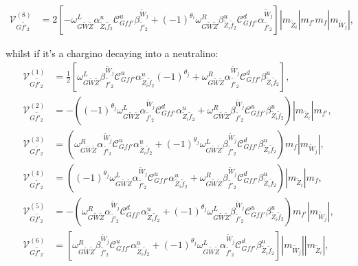 \documentclass[final,3p,times]{elsarticle}
\begin{document}
\begin{align}
\mathcal{V}_{G \tilde{f'}_2}^{(8)} &= 2[-\omega_{G \tilde{W} \tilde{Z}}^L \alpha_{\tilde{Z}_i \tilde{f}_2}^{u} \mathcal{C}_{G f f'}^u \beta_{\tilde{f'}_2}^{\tilde{W}_j} + (-1)^{\theta_i} \omega_{G \tilde{W} \tilde{Z}}^R \beta_{\tilde{Z}_i \tilde{f}_2}^{u} \mathcal{C}_{G f f'}^d \alpha_{\tilde{f'}_2}^{\tilde{W}_j}]|m_{\tilde{Z}_i}|m_{f'}m_{f}|m_{\tilde{W}_j}|,
\end{align}

whilst if it's a chargino decaying into a neutralino:
\begin{align}
\mathcal{V}_{G \tilde{f'}_2}^{(1)} &= \frac{1}{2}[\omega_{G \tilde{W} \tilde{Z}}^L \beta_{\tilde{f'}_2}^{\tilde{W}_j} \mathcal{C}_{G f f'}^u \alpha_{\tilde{Z}_i \tilde{f}_2}^{u} (-1)^{\theta_j} + \omega_{G \tilde{W} \tilde{Z}}^R \alpha_{\tilde{f'}_2}^{\tilde{W}_j} \mathcal{C}_{G f f'}^d \beta_{\tilde{Z}_i \tilde{f}_2}^{u} ], \\
\mathcal{V}_{G \tilde{f'}_2}^{(2)} &= -((-1)^{\theta_j}\omega_{G \tilde{W} \tilde{Z}}^L \alpha_{\tilde{f'}_2}^{\tilde{W}_j} \mathcal{C}_{G f f'}^d \alpha_{\tilde{Z}_i \tilde{f}_2}^{u} +  \omega_{G \tilde{W} \tilde{Z}}^R \beta_{\tilde{f'}_2}^{\tilde{W}_j} \mathcal{C}_{G f f'}^u \beta_{\tilde{Z}_i \tilde{f}_2}^{u})|m_{\tilde{Z}_i}|m_{f'}, \\
\mathcal{V}_{G \tilde{f'}_2}^{(3)} &= (\omega_{G \tilde{W} \tilde{Z}}^R \alpha_{\tilde{f'}_2}^{\tilde{W}_j} \mathcal{C}_{G f f'}^u \alpha_{\tilde{Z}_i \tilde{f}_2}^{u} + (-1)^{\theta_j}\omega_{G \tilde{W} \tilde{Z}}^L \beta_{\tilde{f'}_2}^{\tilde{W}_j} \mathcal{C}_{G f f'}^d \beta_{\tilde{Z}_i \tilde{f}_2}^{u})m_{f}|m_{\tilde{W}_j}| ,\\
\mathcal{V}_{G \tilde{f'}_2}^{(4)} &= ((-1)^{\theta_j}\omega_{G \tilde{W} \tilde{Z}}^L \alpha_{\tilde{f'}_2}^{\tilde{W}_j} \mathcal{C}_{G f f'}^u \alpha_{\tilde{Z}_i \tilde{f}_2}^{u} + \omega_{G \tilde{W} \tilde{Z}}^R \beta_{\tilde{f'}_2}^{\tilde{W}_j} \mathcal{C}_{G f f'}^d \beta_{\tilde{Z}_i \tilde{f}_2}^{u} ) |m_{\tilde{Z}_i}| m_{f}, \\
\mathcal{V}_{G \tilde{f'}_2}^{(5)} &= -(\omega_{G \tilde{W} \tilde{Z}}^R \alpha_{\tilde{f'}_2}^{\tilde{W}_j} \mathcal{C}_{G f f'}^d \alpha_{\tilde{Z}_i \tilde{f}_2}^{u} + (-1)^{\theta_j} \omega_{G \tilde{W} \tilde{Z}}^L \beta_{\tilde{f'}_2}^{\tilde{W}_j} \mathcal{C}_{G f f'}^u \beta_{\tilde{Z}_i \tilde{f}_2}^{u})m_{f'}|m_{\tilde{W}_j}|, \\
\mathcal{V}_{G \tilde{f'}_2}^{(6)} &= [\omega_{G \tilde{W} \tilde{Z}}^R \beta_{\tilde{f'}_2}^{\tilde{W}_j} \mathcal{C}_{G f f'}^u \alpha_{\tilde{Z}_i \tilde{f}_2}^{u} + (-1)^{\theta_j}\omega_{G \tilde{W} \tilde{Z}}^L \alpha_{\tilde{f'}_2}^{\tilde{W}_j} \mathcal{C}_{G f f'}^d \beta_{\tilde{Z}_i \tilde{f}_2}^{u}]|m_{\tilde{W}_j}||m_{\tilde{Z}_i}|, \\

\end{align}
\end{document}
